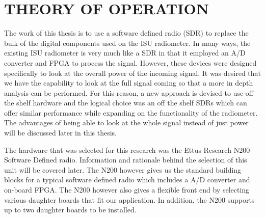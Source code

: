 

\chapter{THEORY OF OPERATION}

The work of this thesis is to use a software defined radio (SDR) to replace the bulk of the digital components used on the ISU radiometer.  In many ways, the existing ISU radiometer is very much like a SDR in that it employed an A/D converter and FPGA to process the signal.  However, these devices were designed specifically to look at the overall power of the incoming signal.  It was desired that we have the capability to look at the full signal coming so that a more in depth analysis can be performed.  For this reason, a new approach is devised to use off the shelf hardware and the logical choice was an off the shelf SDRs which can offer similar performance while expanding on the functionality of the radiometer.  The advantages of being able to look at the whole signal instead of just power will be discussed later in this thesis.

The hardware that was selected for this research was the Ettus Research N200 Software Defined radio.  Information and rationale behind the selection of this unit will be covered later.  The N200 however gives us the standard building blocks for a typical software defined radio which includes a A/D converter and on-board FPGA.  The N200 however also gives a flexible front end by selecting various daughter boards that fit our application.  In addition, the N200 supports up to two daughter boards to be installed.  


